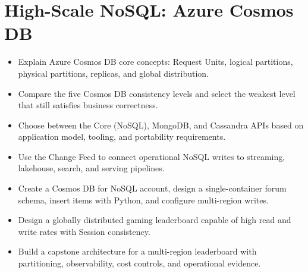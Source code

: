\chapter{High-Scale NoSQL: Azure Cosmos DB}
%
\begin{objectives}
\begin{itemize}
    \item Explain Azure Cosmos DB core concepts: Request Units, logical partitions, physical partitions, replicas, and global distribution.
    \item Compare the five Cosmos DB consistency levels and select the weakest level that still satisfies business correctness.
    \item Choose between the Core (NoSQL), MongoDB, and Cassandra APIs based on application model, tooling, and portability requirements.
    \item Use the Change Feed to connect operational NoSQL writes to streaming, lakehouse, search, and serving pipelines.
    \item Create a Cosmos DB for NoSQL account, design a single-container forum schema, insert items with Python, and configure multi-region writes.
    \item Design a globally distributed gaming leaderboard capable of high read and write rates with Session consistency.
    \item Build a capstone architecture for a multi-region leaderboard with partitioning, observability, cost controls, and operational evidence.
\end{itemize}
\end{objectives}

